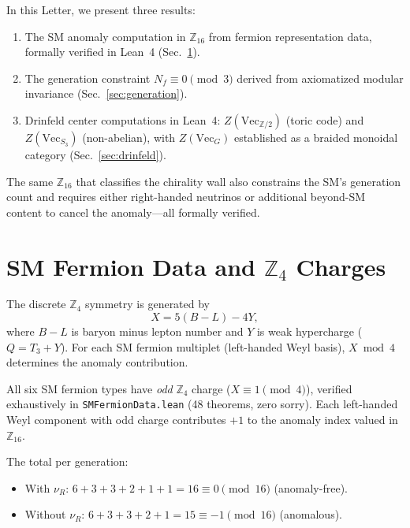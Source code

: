 \documentclass[aps,prl,twocolumn,superscriptaddress]{revtex4-2}
\begin{document}
In this Letter, we present three results:

\begin{enumerate}
\item The SM anomaly computation in $\mathbb{Z}_{16}$ from fermion
representation data, formally verified in Lean~4 (Sec.~\ref{sec:anomaly}).
\item The generation constraint $N_f \equiv 0 \pmod{3}$ derived from
axiomatized modular invariance (Sec.~\ref{sec:generation}).
\item Drinfeld center computations in Lean~4:
$Z(\mathrm{Vec}_{\mathbb{Z}/2})$ (toric code) and $Z(\mathrm{Vec}_{S_3})$
(non-abelian), with $Z(\mathrm{Vec}_G)$ established as a braided monoidal
category (Sec.~\ref{sec:drinfeld}).
\end{enumerate}

The same $\mathbb{Z}_{16}$ that classifies the chirality wall also constrains
the SM's generation count and requires either right-handed neutrinos or
additional beyond-SM content to cancel the anomaly---all formally verified.

\section{SM Fermion Data and $\mathbb{Z}_4$ Charges}
\label{sec:anomaly}

The discrete $\mathbb{Z}_4$ symmetry is generated by~\cite{GarciaEtxebarria2019}
\begin{equation}
X = 5(B-L) - 4Y,
\end{equation}
where $B-L$ is baryon minus lepton number and $Y$ is weak hypercharge
($Q = T_3 + Y$). For each SM fermion multiplet (left-handed Weyl basis),
$X \bmod 4$ determines the anomaly contribution.

All six SM fermion types have \emph{odd} $\mathbb{Z}_4$ charge ($X \equiv 1 \pmod{4}$),
verified exhaustively in \texttt{SMFermionData.lean} (48 theorems, zero sorry).
Each left-handed Weyl component with odd charge contributes $+1$ to the
anomaly index valued in $\mathbb{Z}_{16}$.

The total per generation:
\begin{itemize}
\item With $\nu_R$: $6 + 3 + 3 + 2 + 1 + 1 = 16 \equiv 0 \pmod{16}$ (anomaly-free).
\item Without $\nu_R$: $6 + 3 + 3 + 2 + 1 = 15 \equiv -1 \pmod{16}$ (anomalous).
\end{itemize}
\end{document}
